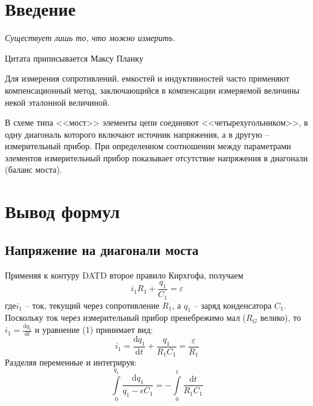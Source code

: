 \documentclass[a4paper,12pt]{extarticle}
\def\source{templates}
\begin{document}

\tableofcontents
\newpage

\section*{Введение} %
\label{sec:input}
\epigraph{\textit{Существует лишь то, что можно измерить.}}
{Цитата приписывается Максу Планку}




 Для измерения сопротивлений, емкостей и индуктивностей  часто  применяют
компенсационный метод, заключающийся в компенсации измеряемой величины некой эталонной величиной. 

В схеме типа <<мост>> элементы цепи соединяют  <<четырехугольником>>, в одну диагональ  которого  включают  источник  напряжения,  а  в  другую  --
измерительный  прибор.  При  определенном  соотношении   между   параметрами
элементов измерительный прибор показывает отсутствие напряжения в  диагонали
(баланс моста).


\newpage
\section{Вывод формул}
\subsection{Напряжение на диагонали моста}

Применяя к контуру DATD второе правило Кирхгофа, получаем
\begin{equation}
i_1 R_1 + \frac{q_1}{C_1}=\varepsilon
\end{equation}
где$ i_1$ -- ток, текущий через сопротивление $R_1$, а $q_1$ -- заряд конденсатора $C_1$. 
Поскольку ток через измерительный прибор пренебрежимо мал ($R_G$ велико), то $i_1=\frac{\mathrm{d}q_1 }{\mathrm{d} t}$ и уравнение (1) принимает вид:
\begin{equation}
i_1=\frac{\mathrm{d}q_1 }{\mathrm{d} t} + \frac{q_1}{R_1 C_1}=\frac{\varepsilon}{R_1}
\end{equation}
Разделяя переменные и интегрируя:
\begin{equation}
 \int \limits^{q_1}_0 \frac{\mathrm{d} q_1}{q_1-\epsilon C_1}=-\int \limits^t_0 \frac{\mathrm{d} t}{R_1 C_1}
\end{equation}
\end{document}
